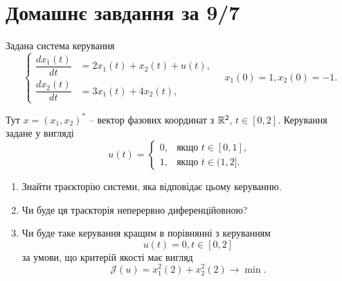 \section{Домашнє завдання за 9/7}

\setcounter{problem}{3}

\begin{problem}
	Задана система керування 
	\[
		\left\{
			\begin{aligned}
				\dfrac{dx_1(t)}{dt} &= 2x_1(t) + x_2(t) + u(t), \\
				\dfrac{dx_2(t)}{dt} &= 3x_1(t) + 4x_2(t),
			\end{aligned}
		\right.
		\quad
		x_1(0) = 1, x_2(0) = -1.
	\]

	Тут $x = (x_1, x_2)^*$ -- вектор фазових координат з $\mathbb{R}^2$, $t \in [0, 2]$. Керування задане у вигляді
	\[
		u(t) 
		=
		\begin{cases}
			0, & \text{якщо } t \in [0, 1], \\
			1, & \text{якщо } t \in (1, 2].
		\end{cases}
	\]
	
	\begin{enumerate}
		\item Знайти траєкторію системи, яка відповідає цьому керуванню.
		\item Чи буде ця траєкторія неперервно диференційовною?
		\item Чи буде таке керування кращим в порівнянні з керуванням 
		\[
			u(t) = 0, t \in [0, 2]
		\]
		за умови, що критерій якості має вигляд 
		\[
			\mathcal{J}(u) = x_1^2(2) + x_2^2(2) \to \min.
		\]
	\end{enumerate}
\end{problem}

